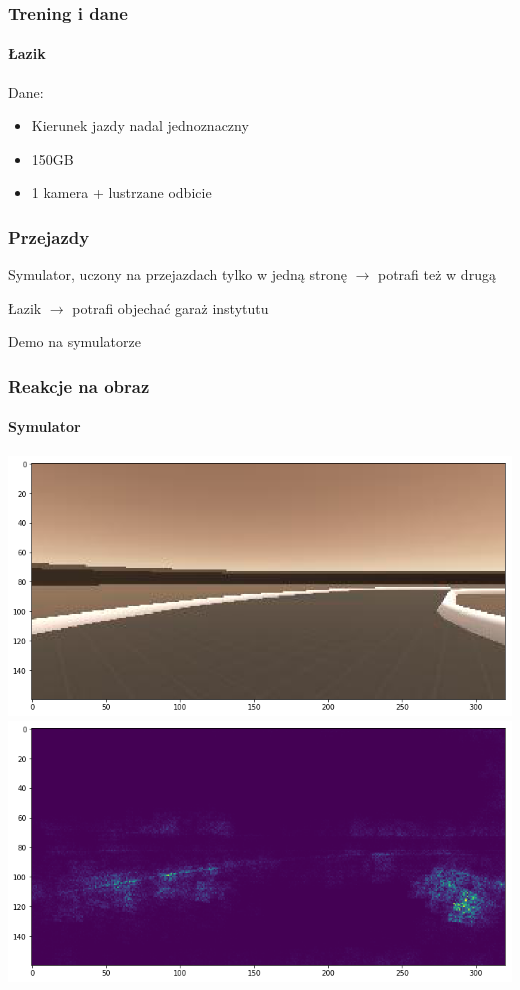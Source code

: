 \documentclass[polish]{beamer}
\begin{document}
\begin{frame}
\frametitle{Trening i dane}
\framesubtitle{Łazik}
Dane:
\begin{itemize}
\item Kierunek jazdy nadal jednoznaczny
\item 150GB
\item 1 kamera + lustrzane odbicie
\end{itemize}
\end{frame}

\begin{frame}
\frametitle{Przejazdy}
Symulator, uczony na przejazdach tylko w jedną stronę $\rightarrow$ potrafi też w drugą

Łazik $\rightarrow$ potrafi objechać garaż instytutu
\pause

Demo na symulatorze

\end{frame}

\begin{frame}
\frametitle{Reakcje na obraz}
\framesubtitle{Symulator}
\begin{center}
\includegraphics[height=0.42\textheight]{sim_img.png}
\includegraphics[height=0.42\textheight]{sim_img_act.png}
\end{center}
\end{frame}
\end{document}
